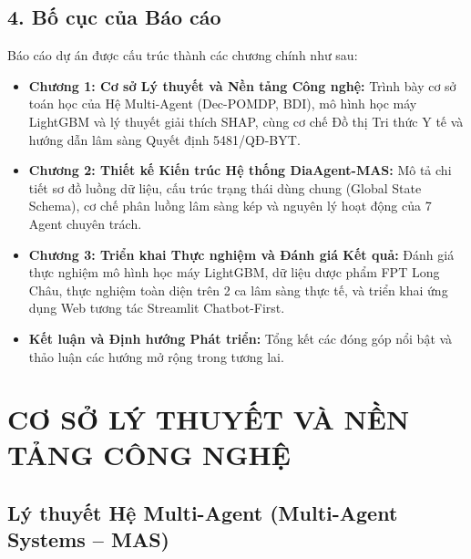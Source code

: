 \documentclass[12pt,a4paper]{article}
\begin{document}
\subsection*{4. Bố cục của Báo cáo}
Báo cáo dự án được cấu trúc thành các chương chính như sau:
\begin{itemize}[leftmargin=1.2cm]
    \item \textbf{Chương 1: Cơ sở Lý thuyết và Nền tảng Công nghệ:} Trình bày cơ sở toán học của Hệ Multi-Agent (Dec-POMDP, BDI), mô hình học máy LightGBM và lý thuyết giải thích SHAP, cùng cơ chế Đồ thị Tri thức Y tế và hướng dẫn lâm sàng Quyết định 5481/QĐ-BYT.
    \item \textbf{Chương 2: Thiết kế Kiến trúc Hệ thống DiaAgent-MAS:} Mô tả chi tiết sơ đồ luồng dữ liệu, cấu trúc trạng thái dùng chung (Global State Schema), cơ chế phân luồng lâm sàng kép và nguyên lý hoạt động của 7 Agent chuyên trách.
    \item \textbf{Chương 3: Triển khai Thực nghiệm và Đánh giá Kết quả:} Đánh giá thực nghiệm mô hình học máy LightGBM, dữ liệu dược phẩm FPT Long Châu, thực nghiệm toàn diện trên 2 ca lâm sàng thực tế, và triển khai ứng dụng Web tương tác Streamlit Chatbot-First.
    \item \textbf{Kết luận và Định hướng Phát triển:} Tổng kết các đóng góp nổi bật và thảo luận các hướng mở rộng trong tương lai.
\end{itemize}


\section{CƠ SỞ LÝ THUYẾT VÀ NỀN TẢNG CÔNG NGHỆ}

\subsection{Lý thuyết Hệ Multi-Agent (Multi-Agent Systems -- MAS)}
\end{document}

